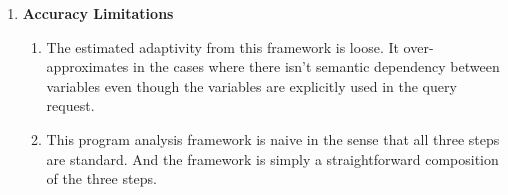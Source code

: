 {\begin{enumerate}
\begin{enumerate}
 However, this rewriting is low-efficient and unnecessary.
 The re-assignment problem can be resolved efficiently and accurately through many state-of-art static program analysis techniques, such as the
 variable reachable analysis, etc..
 \item Their variable estimation algorithm is low-efficient by their \textbf{ag-loop} rule in Figure~\ref{fig:prework-static_ag1},
 and rule \textbf{ad-loop} in Figure~\ref{fig:prework-static_alg2}.
 These two rules unfold every iteration of the while loop and create new annotated variables for every iteration.
 This operation increased the complexity of the program analysis by exponential factors. 
 \item For the same reason as above, their \textbf{Graph Generation} algorithm is low-efficient as well.
 \end{enumerate}
 \item \textbf{Accuracy Limitations}
 \begin{enumerate}
 \item The estimated adaptivity from this framework is loose.
 It over-approximates in the cases where there isn't semantic dependency between variables even though the variables
 are explicitly used in the query request.
 \item This program analysis framework is naive in the sense that all three steps are standard.
 And the framework is simply a straightforward composition of the three steps.
 \end{enumerate}
\end{enumerate}
}